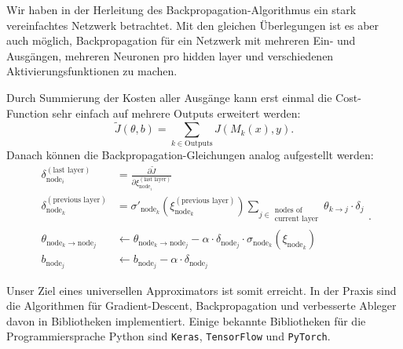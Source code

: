 Wir haben in der Herleitung des Backpropagation-Algorithmus ein stark vereinfachtes
Netzwerk betrachtet. Mit den gleichen Überlegungen ist es aber auch möglich,
Backpropagation für ein Netzwerk mit mehreren Ein- und Ausgängen, mehreren Neuronen pro
hidden layer und verschiedenen Aktivierungsfunktionen zu machen.

Durch Summierung der Kosten aller Ausgänge kann erst einmal die Cost-Function sehr einfach
auf mehrere Outputs erweitert werden:
\[
    \tilde J(\theta, b) = \sum_{k\in \text{Outputs}} J(M_k(x), y).
\]
Danach können die Backpropagation-Gleichungen analog aufgestellt werden:
\begin{equation}
\begin{aligned}
    \delta_{\text{node}_i}^{(\text{last layer})} &=
        \frac{\partial \tilde J}{\partial \xi_{\text{node}_i}^{(\text{last layer})}} \\
    \delta_{\text{node}_k}^{(\text{previous layer})} &=
        \sigma'_{\text{node}_k} \left( \xi_{\text{node}_k}^{(\text{previous layer})} \right) 
        \sum_{j\in \substack{\text{nodes of}\\\text{current layer}}}
        \theta_{k\rightarrow j} \cdot \delta_j\\
    \theta_{\text{node}_k\rightarrow\text{node}_j} &\leftarrow
        \theta_{\text{node}_k\rightarrow\text{node}_j} -
        \alpha \cdot \delta_{\text{node}_j} \cdot \sigma_{\text{node}_k}(\xi_{\text{node}_k}) \\
    b_{\text{node}_j} &\leftarrow b_{\text{node}_j} - \alpha \cdot \delta_{\text{node}_j}
\end{aligned}.
\label{ml:ann:bp:update}
\end{equation}

\bigskip
Unser Ziel eines universellen Approximators ist somit erreicht. In der Praxis sind die
Algorithmen für Gradient-Descent, Backpropagation und verbesserte Ableger davon in
Bibliotheken implementiert. Einige bekannte Bibliotheken für die Programmiersprache Python
sind \texttt{Keras}, \texttt{TensorFlow} und \texttt{PyTorch}.